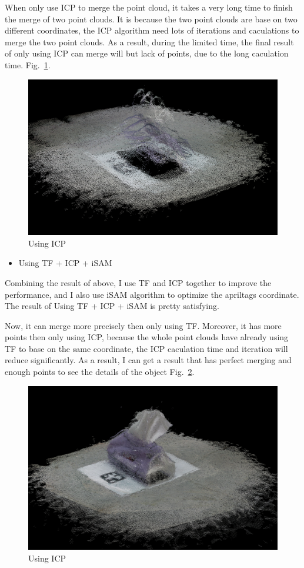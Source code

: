 \documentclass[letterpaper, 10 pt, conference]{ieeeconf}  %
\begin{document}
When only use ICP to merge the point cloud, it takes a very long time to finish the merge of two point clouds. It is because the two point clouds are base on two different coordinates, the ICP algorithm need lots of iterations and caculations to merge the two point clouds. As a result, during the limited time, the final result of only using ICP can merge will but lack of points, due to the long caculation time. Fig.~\ref{figure:ICP}.

\begin{figure}[h] %
\includegraphics[width=0.8\columnwidth]{icp}
\centering
\caption{Using ICP}
\label{figure:ICP}
\end{figure}

\begin{itemize}
\item Using TF + ICP + iSAM
\end{itemize}

Combining the result of above, I use TF and ICP together to improve the performance, and I also use iSAM algorithm to optimize the apriltags coordinate. The result of Using TF + ICP + iSAM is pretty satisfying. 

Now, it can merge more precisely then only using TF. Moreover, it has more points then only using ICP, because the whole point clouds have already using TF to base on the same coordinate, the ICP caculation time and iteration will reduce significantly. As a result, I can get a result that has perfect merging and enough points to see the details of the object Fig.~\ref{figure:iSAM}.

\begin{figure}[h] %
\includegraphics[width=0.8\columnwidth]{iSAM}
\centering
\caption{Using ICP}
\label{figure:iSAM}
\end{figure}
\end{document}
